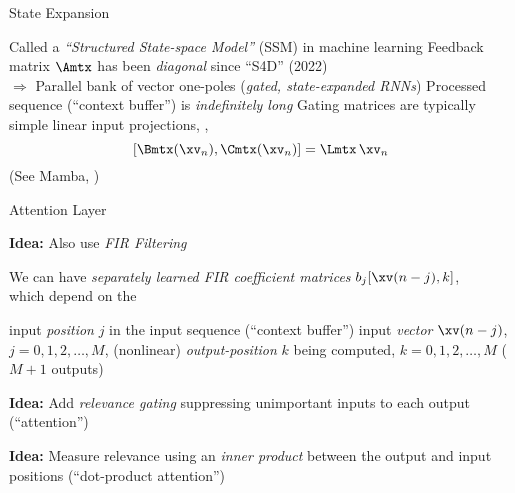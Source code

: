 \begin{slide}[\slideopts]{State Expansion}

%

\vspace{-2em}
\vspace{-2em}
\begin{itemize}
  \mpitem Called a \emph{``Structured State-space Model''} (SSM) in machine learning
  \mpitem Feedback matrix $\Amtx$ has been \emph{diagonal} since ``S4D'' (2022)\\
  	  $\Rightarrow$ Parallel bank of vector one-poles (\emph{gated, state-expanded RNNs})
  \mpitem Processed sequence (``context buffer'') is \emph{indefinitely long}
  \mpitem Gating matrices are typically simple linear input projections, \eg,
  \[
    [\Bmtx(\xv_n), \Cmtx(\xv_n)] = \Lmtx\,\xv_n  %
  \] 
  (See Mamba, \eg)
\end{itemize}

\end{slide}

\begin{slide}[\slideopts,toc={Attention}]{Attention Layer}

\vspace{-1em}

\textbf{Idea:} Also use \emph{FIR Filtering}



\vspace{-1em}

We can have \emph{separately learned FIR coefficient matrices} $b_j[\xv(n-j),k]$, \\
  which depend on the
  \begin{enumerate}
    \mpitem input \emph{position} $j$ in the input sequence (``context buffer'')
    \mpitem input \emph{vector} $\xv(n-j)$, $j=0,1,2,\dots,M$, (nonlinear)
    \mpitem \emph{output-position} $k$ being computed, $k=0,1,2,\dots,M$ ($M+1$ outputs)
  \end{enumerate}

\maybepause
\textbf{Idea:} Add \emph{relevance gating} suppressing unimportant inputs to each output (``attention'')

\vspace{0.5em}

\maybepause
\textbf{Idea:} Measure relevance using an \emph{inner product} between the output and input positions (``dot-product attention'')
\end{slide}


